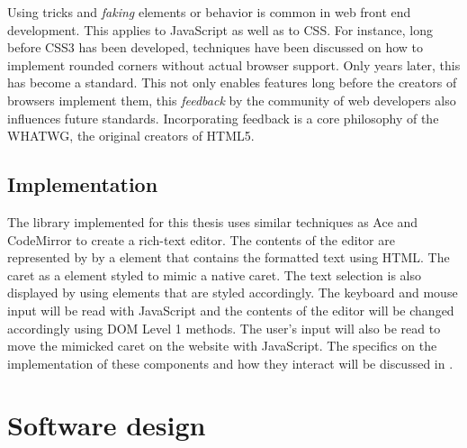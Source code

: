Using tricks and \textit{faking} elements or behavior is common in web front end development. This applies to JavaScript as well as to CSS. For instance, long before CSS3 has been developed, techniques have been discussed on how to implement rounded corners without actual browser support. Only years later, this has become a standard. This not only enables features long before the creators of browsers implement them, this \textit{feedback} by the community of web developers also influences future standards. Incorporating feedback is a core philosophy of the WHATWG, the original creators of HTML5.



\section{Implementation}

The library implemented for this thesis uses similar techniques as Ace and CodeMirror to create a rich-text editor. The contents of the editor are represented by by a  element that contains the formatted text using HTML. The caret as a  element styled to mimic a native caret. The text selection is also displayed by using  elements that are styled accordingly. The keyboard and mouse input will be read with JavaScript and the contents of the editor will be changed accordingly using DOM Level 1 methods. The user's input will also be read to move the mimicked caret on the website with JavaScript. The specifics on the implementation of these components and how they interact will be discussed in .




\chapter{Software design}
\label{ch:concept_principles}

